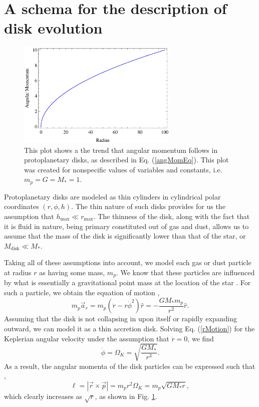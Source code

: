 \documentclass[aps,pra,twocolumn]{revtex4-1}
\begin{document}
\section{\label{section 2} A schema for the description of disk evolution}
\begin{figure} [b!]
	\includegraphics[width=3in]{angularMomentum.eps}
	\caption{This plot shows a the trend that angular momentum follows in protoplanetary disks, as described in Eq. (\ref{angMomEq}).  This plot was created for nonspecific values of variables and constants, i.e. $m_p = G = M_* = 1$. \label{angMom}}
\end{figure}


Protoplanetary disks are modeled as thin cylinders in cylindrical polar coordinates $(r, \phi, h)$.  The thin nature of such disks provides for us the assumption that $h_{\text{max}} \ll r_{\text{max}}$.  The thinness of the disk, along with the fact that it is fluid in nature, being primary constituted out of gas and dust, allows us to assume that the mass of the disk is significantly lower than that of the star, or $M_{\text{disk}} \ll M_{*}$.  

Taking all of these assumptions into account, we model each gas or dust particle at radius $r$ as having some mass, $m_p$.  We know that these particles are influenced by what is essentially a gravitational point mass at the location of the star \cite{armitage2011}.  For such a particle, we obtain the equation of motion \cite{taylor2005},
\begin{equation}
m_p \vec{a}_r = m_p ( \ddot{r} - r\dot{\phi}^2 )\hat{r} = - \frac{G M_* m_p}{r^2}\hat{r} . \label{rMotion}
\end{equation}
Assuming that the disk is not collapsing in upon itself or rapidly expanding outward, we can model it as a thin accretion disk.  Solving Eq. (\ref{rMotion}) for the Keplerian angular velocity under the assumption that $\ddot{r} = 0$, we find \cite{armitage2011}
\begin{equation}
\dot{\phi} = \Omega_K = \sqrt{\frac{G M_*}{r^3}}.
\end{equation}
As a result, the angular momenta of the disk particles can be expressed such that \cite{taylor2005},
\begin{equation}
\ell = \left| \vec{r} \times \vec{p} \right| = m_p r^2 \Omega_K = m_p \sqrt{G M_* r}, \label{angMomEq}
\end{equation}
which clearly increases as $\sqrt{r}$, as shown in Fig. \ref{angMom}.  
\end{document}
